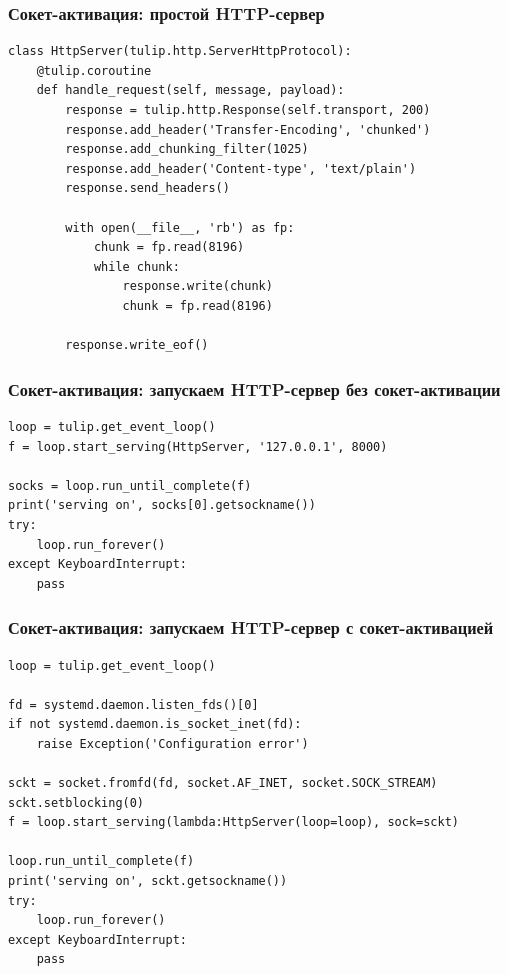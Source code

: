 \documentclass[aspectratio=169]{beamer}
\begin{document}
\begin{frame}[fragile]
  \frametitle{Сокет-активация: простой HTTP-сервер}

  \begin{lstlisting}
class HttpServer(tulip.http.ServerHttpProtocol):
    @tulip.coroutine
    def handle_request(self, message, payload):
        response = tulip.http.Response(self.transport, 200)
        response.add_header('Transfer-Encoding', 'chunked')
        response.add_chunking_filter(1025)
        response.add_header('Content-type', 'text/plain')
        response.send_headers()

        with open(__file__, 'rb') as fp:
            chunk = fp.read(8196)
            while chunk:
                response.write(chunk)
                chunk = fp.read(8196)

        response.write_eof()
  \end{lstlisting}

\end{frame}


\begin{frame}[fragile]
  \frametitle{Сокет-активация: запускаем HTTP-сервер без сокет-активации}

  \begin{lstlisting}
loop = tulip.get_event_loop()
f = loop.start_serving(HttpServer, '127.0.0.1', 8000)

socks = loop.run_until_complete(f)
print('serving on', socks[0].getsockname())
try:
    loop.run_forever()
except KeyboardInterrupt:
    pass
  \end{lstlisting}

\end{frame}


\begin{frame}[fragile]
  \frametitle{Сокет-активация: запускаем HTTP-сервер с сокет-активацией}

  \begin{lstlisting}
loop = tulip.get_event_loop()

fd = systemd.daemon.listen_fds()[0]
if not systemd.daemon.is_socket_inet(fd):
    raise Exception('Configuration error')

sckt = socket.fromfd(fd, socket.AF_INET, socket.SOCK_STREAM)
sckt.setblocking(0)
f = loop.start_serving(lambda:HttpServer(loop=loop), sock=sckt)

loop.run_until_complete(f)
print('serving on', sckt.getsockname())
try:
    loop.run_forever()
except KeyboardInterrupt:
    pass
  \end{lstlisting}

\end{frame}
\end{document}
